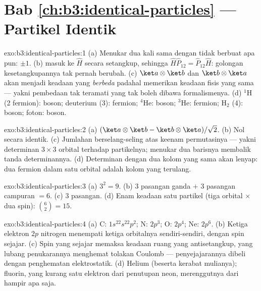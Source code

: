 \section*{Bab \ref{ch:b3:identical-particles} --- Partikel Identik}

\begin{solution}{exo:b3:identical-particles:1}
(a) Menukar dua kali sama dengan tidak berbuat apa pun: 
$\pm1$. (b)  masuk ke $\hat H$ secara setangkup,
sehingga $\hat H\hat
P_{12} = \hat P_{12}\hat H$: golongan kesetangkupannya tak pernah
berubah. (c)
$\ket a\otimes\ket b$ dan $\ket b\otimes\ket a$ akan menjadi keadaan yang
\emph{berbeda} padahal memerikan keadaan fisis yang sama --- yakni
pembedaan tak teramati yang tak boleh dibawa formalismenya. (d)
$^1$H (2 fermion): boson; deuterium (3): fermion; $^4$He: boson;
$^3$He: fermion; H$_2$ (4): boson; foton: boson.
\end{solution}

\begin{solution}{exo:b3:identical-particles:2}
(a) $(\ket a\otimes\ket b - \ket b\otimes\ket a)/\sqrt2$. (b)
Nol secara identik. (c) Jumlahan berselang-seling atas keenam
permutasinya --- yakni determinan $3\times3$ orbital terhadap
partikelnya; menukar dua barisnya membalik tanda determinannya. (d)
Determinan dengan dua kolom yang sama akan lenyap: dua fermion dalam
satu orbital adalah kolom yang terulang.
\end{solution}

\begin{solution}{exo:b3:identical-particles:3}
(a) $3^2 = 9$. (b) $3$ pasangan ganda $+$ $3$ pasangan campuran $= 6$.
(c) $3$ pasangan.
(d) Enam keadaan satu partikel (tiga orbital $\times$ dua spin):
$\binom62 = 15$.
\end{solution}

\begin{solution}{exo:b3:identical-particles:4}
(a) C: $1s^22s^22p^2$; N: $2p^3$; O: $2p^4$; Ne: $2p^6$. (b)
Ketiga elektron $2p$ nitrogen menempati ketiga orbitalnya
sendiri-sendiri, dengan spin sejajar. (c) Spin yang sejajar memaksa
keadaan ruang yang antisetangkup, yang lubang penukarannya menghemat
tolakan Coulomb --- penyejajarannya dibeli dengan penghematan
elektrostatik. (d) Helium (beserta kerabat mulianya); fluorin, yang
kurang satu elektron dari penutupan neon, merenggutnya dari hampir apa
saja.
\end{solution}

